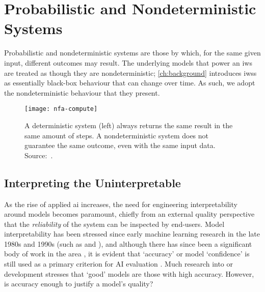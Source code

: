 \section{Probabilistic and Nondeterministic Systems}
\label{sec:background:probabilistic-stochastic}

Probabilistic and nondeterministic systems are those by which, for the same given input, different outcomes may result. The underlying models that power an \gls{iws} are treated as though they are nondeterministic; \cref{ch:background} introduces \glspl{iws} as essentially black-box behaviour that can change over time. As such, we adopt the nondeterministic behaviour that they present.

\begin{figure}[h!]
  \centering
  \texttt{[image: nfa-compute]}
  \caption[Deterministic versus nondeterministic systems]{A deterministic system (left) always returns the same result in the same amount of steps. A nondeterministic system does not guarantee the same outcome, even with the same input data. Source:~\citep{Finalyson:2018aa}.}
  \label{fig:background:probabilistic-stochastic:nfa-compute}
\end{figure}

\subsection{Interpreting the Uninterpretable}
\label{ssec:background:probabilistic-stochastic:model-interpretability}

As the rise of applied \gls{ai} increases, the need for engineering interpretability around models becomes paramount, chiefly from an external quality perspective that the \textit{reliability} of the system can be inspected by end-users. Model interpretability has been stressed since early machine learning research in the late 1980s and 1990s (such as \citet{Quinlan:1999ue} and \citet{Michie:1988te}), and although there has since been a significant body of work in the area \citep{Singh:2016wu,Baehrens:2010tj,Ribeiro:2016gg,Bussone:2015wm,Ross:2017vn,Lipton:2016if,Boz:2002uv,Johansson:2009uo,Augasta:2012wx,Fung:2005we,Dejaeger:2012up,VanAssche:2007wc,BenDavid:1995up,Feelders:2000ve,Lima:2009tm,Martens:2011uh,Pazzani:1997vp,Verbeke:2011vo}, it is evident that `accuracy' or model `confidence' is still used as a primary criterion for AI evaluation \citep{Huang:2005tc,Japkowicz:2011vy,Sokolova:2009vu}. Much research into  or  development stresses that `good' models are those with high accuracy. However, is accuracy enough to justify a model's quality?

